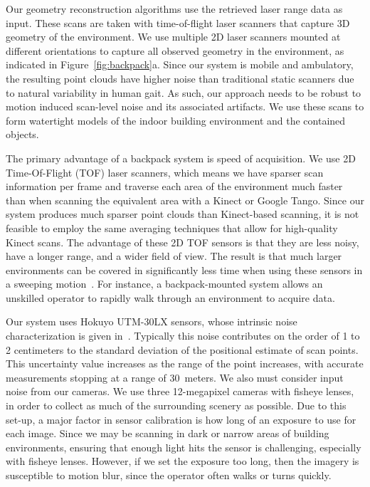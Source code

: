 \documentclass[12pt,onecolumn,oneside]{book}
\begin{document}
Our geometry reconstruction algorithms use the retrieved laser range data as input.  These scans are taken with time-of-flight laser scanners that capture 3D geometry of the environment.  We use multiple 2D laser scanners mounted at different orientations to capture all observed geometry in the environment, as indicated in Figure~\ref{fig:backpack}a.  Since our system is mobile and ambulatory, the resulting point clouds have higher noise than traditional static scanners due to natural variability in human gait.  As such, our approach needs to be robust to motion induced scan-level noise and its associated artifacts.  We use these scans to form watertight models of the indoor building environment and the contained objects.

The primary advantage of a backpack system is speed of acquisition.  We use 2D Time-Of-Flight (TOF) laser scanners, which means we have sparser scan information per frame and traverse each area of the environment much faster than when scanning the equivalent area with a Kinect or Google Tango.  Since our system produces much sparser point clouds than Kinect-based scanning, it is not feasible to employ the same averaging techniques that allow for high-quality Kinect scans.  The advantage of these 2D TOF sensors is that they are less noisy, have a longer range, and a wider field of view.  The result is that much larger environments can be covered in significantly less time when using these sensors in a sweeping motion~\cite{Sweep}.  For instance, a backpack-mounted system allows an unskilled operator to rapidly walk through an environment to acquire data.

Our system uses Hokuyo UTM-30LX sensors, whose intrinsic noise characterization is given in~\cite{Pomerleau12}.  Typically this noise contributes on the order of 1 to 2 centimeters to the standard deviation of the positional estimate of scan points.  This uncertainty value increases as the range of the point increases, with accurate measurements stopping at a range of $30$~meters.  We also must consider input noise from our cameras.  We use three 12-megapixel cameras with fisheye lenses, in order to collect as much of the surrounding scenery as possible.  Due to this set-up, a major factor in sensor calibration is how long of an exposure to use for each image.  Since we may be scanning in dark or narrow areas of building environments, ensuring that enough light hits the sensor is challenging, especially with fisheye lenses.  However, if we set the exposure too long, then the imagery is susceptible to motion blur, since the operator often walks or turns quickly.
\end{document}
